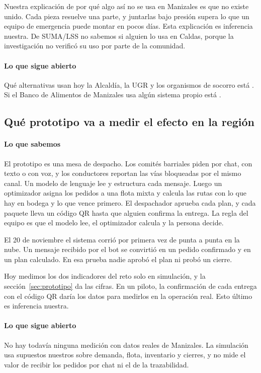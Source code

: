 Nuestra explicación de por qué algo así no se usa en Manizales es que no existe unido. Cada pieza resuelve una parte, y juntarlas bajo presión supera lo que un equipo de emergencia puede montar en pocos días. Esta explicación es inferencia nuestra. De SUMA/LSS no sabemos si alguien lo usa en Caldas, porque la investigación no verificó su uso por parte de la comunidad.

\paragraph{Lo que sigue abierto} Qué alternativas usan hoy la Alcaldía, la UGR y los organismos de socorro está \eninvestigacion. Si el Banco de Alimentos de Manizales usa algún sistema propio está \pendiente.

\subsection{Qué prototipo va a medir el efecto en la región}

\paragraph{Lo que sabemos} El prototipo es una mesa de despacho. Los comités barriales piden por chat, con texto o con voz, y los conductores reportan las vías bloqueadas por el mismo canal. Un modelo de lenguaje lee y estructura cada mensaje. Luego un optimizador asigna los pedidos a una flota mixta y calcula las rutas con lo que hay en bodega y lo que vence primero. El despachador aprueba cada plan, y cada paquete lleva un código QR hasta que alguien confirma la entrega. La regla del equipo es que el modelo lee, el optimizador calcula y la persona decide.

El 20 de noviembre el sistema corrió por primera vez de punta a punta en la nube. Un mensaje recibido por el bot se convirtió en un pedido confirmado y en un plan calculado. En esa prueba nadie aprobó el plan ni probó un cierre.

Hoy medimos los dos indicadores del reto solo en simulación, y la sección~\ref{sec:prototipo} da las cifras. En un piloto, la confirmación de cada entrega con el código QR daría los datos para medirlos en la operación real. Esto último es inferencia nuestra.

\paragraph{Lo que sigue abierto} No hay todavía ninguna medición con datos reales de Manizales. La simulación usa supuestos nuestros sobre demanda, flota, inventario y cierres, y no mide el valor de recibir los pedidos por chat ni el de la trazabilidad.

